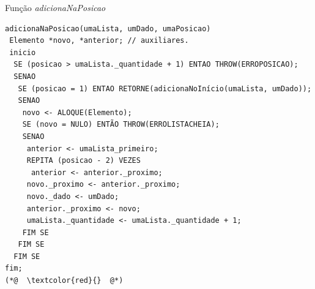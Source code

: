 \documentclass[12pt,table,xcolor={dvipsnames}]{beamer}
\begin{document}
\begin{frame}[fragile]{Função \textit{adicionaNaPosicao}}
\begin{lstlisting}
adicionaNaPosicao(umaLista, umDado, umaPosicao)
 Elemento *novo, *anterior; // auxiliares.
 inicio
  SE (posicao > umaLista._quantidade + 1) ENTAO THROW(ERROPOSICAO);
  SENAO
   SE (posicao = 1) ENTAO RETORNE(adicionaNoInício(umaLista, umDado));
   SENAO
    novo <- ALOQUE(Elemento);
    SE (novo = NULO) ENTÃO THROW(ERROLISTACHEIA);
    SENAO
     anterior <- umaLista_primeiro;
     REPITA (posicao - 2) VEZES
      anterior <- anterior._proximo;
     novo._proximo <- anterior._proximo;
     novo._dado <- umDado;
     anterior._proximo <- novo;
     umaLista._quantidade <- umaLista._quantidade + 1;
    FIM SE
   FIM SE
  FIM SE
fim;
(*@  \textcolor{red}{}  @*)
\end{lstlisting}
\end{frame}
\end{document}
